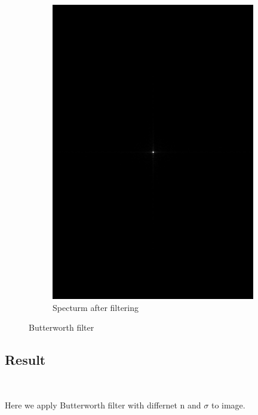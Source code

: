 \documentclass[
	12pt, %
]{style/fphw}
\begin{document}
\begin{figure}[H]
\begin{subfigure}[b]{.3\textwidth}
         \includegraphics[width=\textwidth]{Q5_3_spectrum_filtered_1_30.png}
         \caption{Specturm after filtering}
         \label{Q5_3_spectrum_filtered_1_30}
     \end{subfigure}
    \caption{Butterworth filter}
    \label{Butterworth filter}
\end{figure}

\subsection*{Result} \

Here we apply Butterworth filter with differnet n and $\sigma$ to image.
\end{document}
